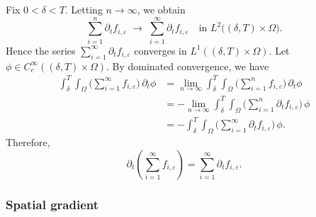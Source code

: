 \documentclass[a4paper,12pt,reqno]{amsart}
\theoremstyle{plain}
\numberwithin{equation}{section}
\begin{document}
	Fix $0<\delta<T$. Letting
	$n\to\infty$, we obtain
	\[
	\sum_{i=1}^{n} \partial_t f_{i,\varepsilon}
	\;\longrightarrow\;
	\sum_{i=1}^{\infty} \partial_t f_{i,\varepsilon}
	\quad \text{in } L^2\!\big((\delta,T)\times\Omega\big).
	\]
	Hence the series $\sum_{i=1}^{\infty} \partial_t f_{i,\varepsilon}$ converges in
	$L^1((\delta,T)\times\Omega)$. Let $\phi\in C_c^\infty((\delta,T)\times\Omega)$. By dominated convergence, we
	have
	\begin{align*}
		\int_{\delta}^{T}\!\!\int_{\Omega}
		\Big(\sum_{i=1}^{\infty} f_{i,\varepsilon}\Big)\,\partial_t \phi
		&=
		\lim_{n\to\infty}
		\int_{\delta}^{T}\!\!\int_{\Omega}
		\Big(\sum_{i=1}^{n} f_{i,\varepsilon}\Big)\,\partial_t \phi
		\\
		&=
		-\lim_{n\to\infty}
		\int_{\delta}^{T}\!\!\int_{\Omega}
		\Big(\sum_{i=1}^{n} \partial_t f_{i,\varepsilon}\Big)\,\phi
		\\
		&=
		-\int_{\delta}^{T}\!\!\int_{\Omega}
		\Big(\sum_{i=1}^{\infty} \partial_t f_{i,\varepsilon}\Big)\,\phi .
	\end{align*}
	Therefore,
	\[
	\partial_t\!\left(\sum_{i=1}^{\infty} f_{i,\varepsilon}\right)
	=
	\sum_{i=1}^{\infty} \partial_t f_{i,\varepsilon}.
	\]
	
	\subsubsection*{Spatial gradient}
	
\end{document}
